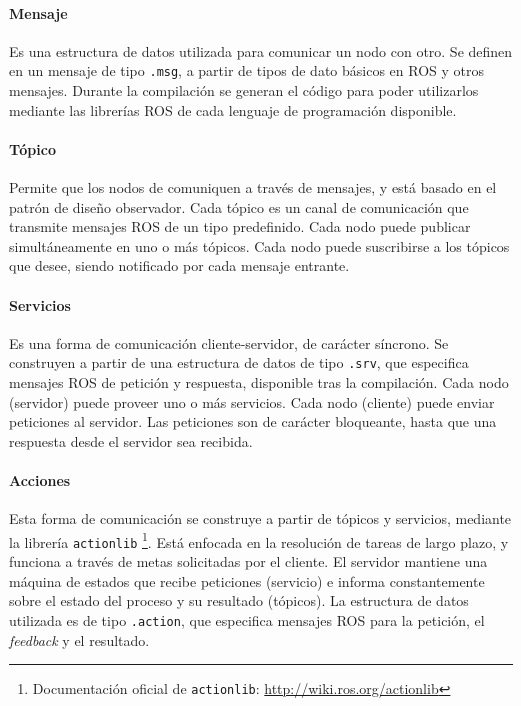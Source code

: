 \paragraph{Mensaje} Es una estructura de datos utilizada para comunicar un nodo con otro. Se definen en un mensaje de tipo \texttt{.msg}, a partir de tipos de dato básicos en ROS y otros mensajes. Durante la compilación se generan el código para poder utilizarlos mediante las librerías ROS de cada lenguaje de programación disponible.

\paragraph{Tópico} Permite que los nodos de comuniquen a través de mensajes, y está basado en el patrón de diseño observador. Cada tópico es un canal de comunicación que transmite mensajes ROS de un tipo predefinido. Cada nodo puede publicar simultáneamente en uno o más tópicos. Cada nodo puede suscribirse a los tópicos que desee, siendo notificado por cada mensaje entrante.

\paragraph{Servicios} Es una forma de comunicación cliente-servidor, de carácter síncrono. Se construyen a partir de una estructura de datos de tipo \texttt{.srv}, que especifica mensajes ROS de petición y respuesta, disponible tras la compilación. Cada nodo (servidor) puede proveer uno o más servicios. Cada nodo (cliente) puede enviar peticiones al servidor. Las peticiones son de carácter bloqueante, hasta que una respuesta desde el servidor sea recibida.

\paragraph{Acciones} Esta forma de comunicación se construye a partir de tópicos y servicios, mediante la librería \texttt{actionlib} \footnote{Documentación oficial de \texttt{actionlib}: \url{http://wiki.ros.org/actionlib}}. Está enfocada en la resolución de tareas de largo plazo, y funciona a través de metas solicitadas por el cliente. El servidor mantiene una máquina de estados que recibe peticiones (servicio) e informa constantemente sobre el estado del proceso y su resultado (tópicos). La estructura de datos utilizada es de tipo \texttt{.action}, que especifica mensajes ROS para la petición, el \textit{feedback} y el resultado.

